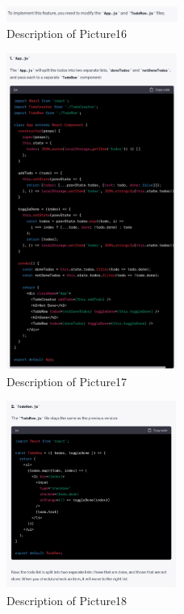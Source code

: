 \documentclass[runningheads]{llncs}
\begin{document}
\begin{figure}[h]
    \centering
    \includegraphics[width=0.5\textwidth]{Pictures/Picture16.jpg}
    \caption{Description of Picture16}
    \label{fig:picture16}
\end{figure}
\begin{figure}[h]
    \centering
    \includegraphics[width=0.5\textwidth]{Pictures/Picture17.jpg}
    \caption{Description of Picture17}
    \label{fig:picture17}
\end{figure}
\begin{figure}[h]
    \centering
    \includegraphics[width=0.5\textwidth]{Pictures/Picture18.jpg}
    \caption{Description of Picture18}
    \label{fig:picture18}
\end{figure}
\end{document}
